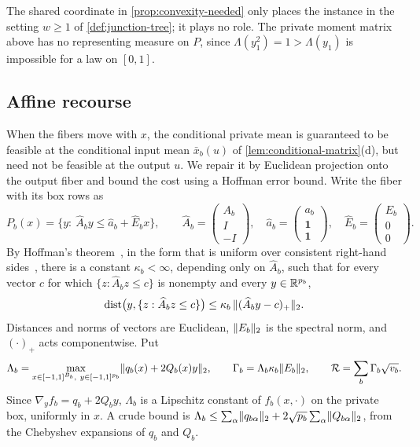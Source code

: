 The shared coordinate in \cref{prop:convexity-needed} only places the
instance in the setting $w\ge1$ of \cref{def:junction-tree}; it plays no role.
The private moment matrix above has no representing measure on $P$, since
$\Lambda(y_1^2)=1>\Lambda(y_1)$ is impossible for a law on $[0,1]$.

\subsection{Affine recourse}\label{sec:rec-affine}

When the fibers move with $x$, the conditional private mean is guaranteed
to be feasible at the conditional input mean $\bar x_b(u)$ of
\cref{lem:conditional-matrix}(d), but need not be feasible at the output
$u$. We repair it by Euclidean projection onto the output fiber and bound
the cost using a Hoffman error bound. Write the fiber with its box rows as
\begin{equation}\label{eq:rec-stacked}
  P_b(x)=\bigl\{y:\ \widehat A_by\le\widehat a_b+\widehat E_bx\bigr\},\qquad
  \widehat A_b=\begin{pmatrix}A_b\\ I\\ -I\end{pmatrix},\quad
  \widehat a_b=\begin{pmatrix}a_b\\ \mathbf 1\\ \mathbf 1\end{pmatrix},\quad
  \widehat E_b=\begin{pmatrix}E_b\\ 0\\ 0\end{pmatrix}.
\end{equation}
By Hoffman's theorem~\cite{hoffman1952-approximate-solutions}, in the form
that is uniform over consistent right-hand
sides~\cite{pena2018-hoffman-constants}, there is a constant
$\kappa_b<\infty$, depending only on $\widehat A_b$, such that for every
vector $c$ for which $\{z:\widehat A_bz\le c\}$ is nonempty and every
$y\in\mathbb{R}^{p_b}$,
\begin{equation}\label{eq:rec-hoffman}
  \operatorname{dist}\bigl(y,\{z:\widehat A_bz\le c\}\bigr)\le
  \kappa_b\,\lVert (\widehat A_by-c)_+\rVert_2 .
\end{equation}
Distances and norms of vectors are Euclidean, $\lVert E_b\rVert_2$ is the
spectral norm, and $(\cdot)_+$ acts componentwise. Put
\begin{equation}\label{eq:rec-affine-constants}
  \Lambda_b=\max_{x\in[-1,1]^{B_b},\ y\in[-1,1]^{p_b}}
  \lVert q_b(x)+2Q_b(x)y\rVert_2,\qquad
  \Gamma_b=\Lambda_b\kappa_b\lVert E_b\rVert_2,\qquad
  \mathcal R=\sum_b\Gamma_b\sqrt{v_b}.
\end{equation}
Since $\nabla_yf_b=q_b+2Q_by$, $\Lambda_b$ is a Lipschitz constant of
$f_b(x,\cdot)$ on the private box, uniformly in $x$. A crude bound is
$\Lambda_b\le\sum_\alpha\lVert q_{b\alpha}\rVert_2+2\sqrt{p_b}\sum_\alpha
\lVert Q_{b\alpha}\rVert_2$, from the Chebyshev expansions of $q_b$ and $Q_b$.

